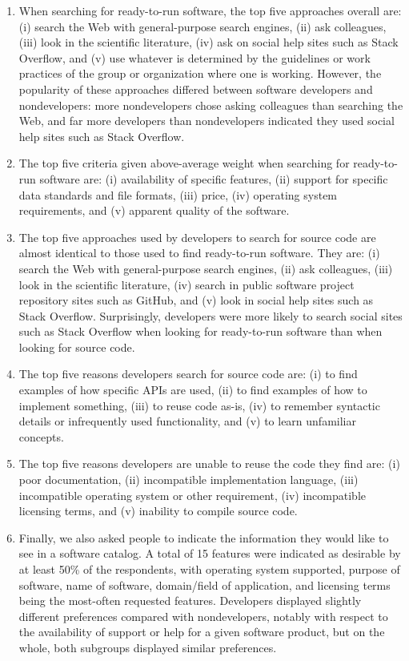 \documentclass{casicswhitepaper}
\begin{document}
\begin{enumerate}

\item When searching for ready-to-run software, the top five approaches overall are: (i) search the Web with general-purpose search engines, (ii) ask colleagues, (iii) look in the scientific literature, (iv) ask on social help sites such as Stack Overflow, and (v) use whatever is determined by the guidelines or work practices of the group or organization where one is working.  However, the popularity of these approaches differed between software developers and nondevelopers: more nondevelopers chose asking colleagues than searching the Web, and far more developers than nondevelopers indicated they used social help sites such as Stack Overflow.

\item The top five criteria given above-average weight when searching for ready-to-run software are: (i) availability of specific features, (ii) support for specific data standards and file formats, (iii) price, (iv) operating system requirements, and (v) apparent quality of the software.

\item The top five approaches used by developers to search for source code are almost identical to those used to find ready-to-run software.  They are: (i) search the Web with general-purpose search engines, (ii) ask colleagues, (iii) look in the scientific literature, (iv) search in public software project repository sites such as GitHub, and (v) look in social help sites such as Stack Overflow.  Surprisingly, developers were more likely to search social sites such as Stack Overflow when looking for ready-to-run software than when looking for source code.

\item The top five reasons developers search for source code are: (i) to find examples of how specific APIs are used, (ii) to find examples of how to implement something, (iii) to reuse code as-is, (iv) to remember syntactic details or infrequently used functionality, and (v) to learn unfamiliar concepts.

\item The top five reasons developers are unable to reuse the code they find are: (i) poor documentation, (ii) incompatible implementation language, (iii) incompatible operating system or other requirement, (iv) incompatible licensing terms, and (v) inability to compile source code.

\item Finally, we also asked people to indicate the information they would like to see in a software catalog.  A total of 15 features were indicated as desirable by at least 50\% of the respondents, with operating system supported, purpose of software, name of software, domain/field of application, and licensing terms being the most-often requested features.  Developers displayed slightly different preferences compared with nondevelopers, notably with respect to the availability of support or help for a given software product, but on the whole, both subgroups displayed similar preferences.

\end{enumerate}
\end{document}
